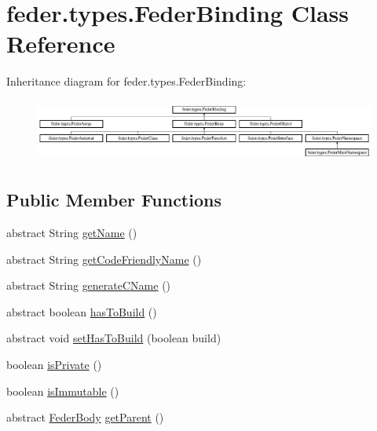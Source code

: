 \hypertarget{classfeder_1_1types_1_1FederBinding}{}\section{feder.\+types.\+Feder\+Binding Class Reference}
\label{classfeder_1_1types_1_1FederBinding}
Inheritance diagram for feder.\+types.\+Feder\+Binding\+:\begin{figure}[H]
\begin{center}
\leavevmode
\includegraphics[height=2.074074cm]{classfeder_1_1types_1_1FederBinding}
\end{center}
\end{figure}
\subsection*{Public Member Functions}
\begin{DoxyCompactItemize}
\item 
abstract String \hyperlink{classfeder_1_1types_1_1FederBinding_ab233b4eb1c5fef826e01cfe610447cea}{get\+Name} ()
\item 
abstract String \hyperlink{classfeder_1_1types_1_1FederBinding_a237e4d83da1cee7e4bcaecea513c4b9d}{get\+Code\+Friendly\+Name} ()
\item 
abstract String \hyperlink{classfeder_1_1types_1_1FederBinding_a8a3a3d920f5312db5beff5c82071cb12}{generate\+C\+Name} ()
\item 
abstract boolean \hyperlink{classfeder_1_1types_1_1FederBinding_a72cdcf7fcc293cfadb311c52abffdd00}{has\+To\+Build} ()
\item 
abstract void \hyperlink{classfeder_1_1types_1_1FederBinding_a8c895588a1ab8067b5697ff5c9608fa5}{set\+Has\+To\+Build} (boolean build)
\item 
boolean \hyperlink{classfeder_1_1types_1_1FederBinding_ad5937fb65ae2d25cc075dcf639dcfe04}{is\+Private} ()
\item 
boolean \hyperlink{classfeder_1_1types_1_1FederBinding_a84df88cf32e2d678fc73f8e868477487}{is\+Immutable} ()
\item 
abstract \hyperlink{classfeder_1_1types_1_1FederBody}{Feder\+Body} \hyperlink{classfeder_1_1types_1_1FederBinding_a28620ccaf5f32f1376e6c6bd1d13452d}{get\+Parent} ()
\end{DoxyCompactItemize}
